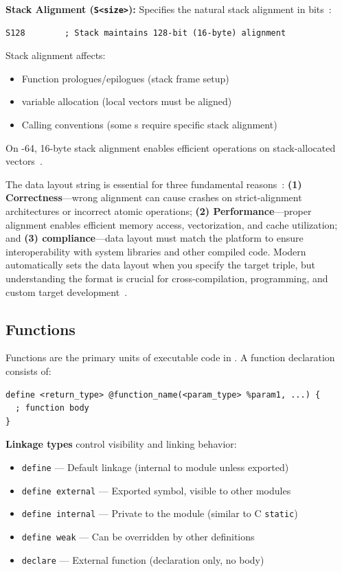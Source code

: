 \textbf{Stack Alignment (\texttt{S<size>}):} Specifies the natural stack alignment in bits~\cite{llvmlangref}:

\begin{lstlisting}[style=ir]
S128        ; Stack maintains 128-bit (16-byte) alignment
\end{lstlisting}

Stack alignment affects:
\begin{itemize}[noitemsep]
  \item Function prologues/epilogues (stack frame setup)
  \item {} variable allocation (local vectors must be aligned)
  \item Calling conventions (some s require specific stack alignment)
\end{itemize}

On -64, 16-byte stack alignment enables efficient  operations on stack-allocated vectors~\cite{lopesauler2014}.

The data layout string is essential for three fundamental reasons~\cite{llvmessentials}: \textbf{(1) Correctness}---wrong alignment can cause crashes on strict-alignment architectures or incorrect atomic operations; \textbf{(2) Performance}---proper alignment enables efficient memory access,  vectorization, and cache utilization; and \textbf{(3)  compliance}---data layout must match the platform  to ensure interoperability with system libraries and other compiled code. Modern  automatically sets the data layout when you specify the target triple, but understanding the format is crucial for cross-compilation,  programming, and custom target development~\cite{lopesauler2014}.

\subsection{Functions}

Functions are the primary units of executable code in  . A function declaration consists of:

\begin{lstlisting}[style=ir]
define <return_type> @function_name(<param_type> %param1, ...) {
  ; function body
}
\end{lstlisting}

\textbf{Linkage types} control visibility and linking behavior:

\begin{itemize}[noitemsep]
  \item \texttt{define} --- Default linkage (internal to module unless exported)
  \item \texttt{define external} --- Exported symbol, visible to other modules
  \item \texttt{define internal} --- Private to the module (similar to C \texttt{static})
  \item \texttt{define weak} --- Can be overridden by other definitions
  \item \texttt{declare} --- External function (declaration only, no body)
\end{itemize}

